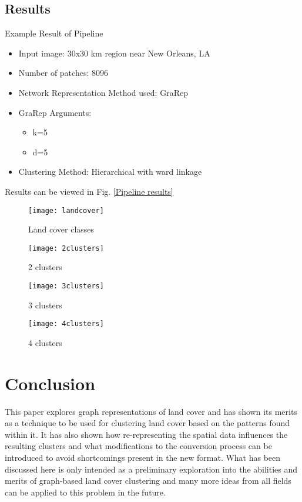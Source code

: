 \documentclass[conference]{IEEEtran}
\begin{document}
	\subsection {Results}
	Example Result of Pipeline
	\begin{itemize}
		\item Input image: 30x30 km region near New Orleans, LA
		\item Number of patches: 8096
		\item Network Representation Method used: GraRep
		\item GraRep Arguments:
		\begin{itemize}
			\item k=5
			\item d=5
		\end{itemize}
		\item Clustering Method: Hierarchical with ward linkage
		
	\end{itemize}
	Results can be viewed in Fig. \ref{Pipeline results}
	\begin{figure*}[t!]
		\centering
		\begin{subfigure}[b]{0.4\textwidth}
			\centering
			\texttt{[image: landcover]}
			\caption{Land cover classes}
			\label{base}
		\end{subfigure}
		\hfill
		\begin{subfigure}[b]{0.4\textwidth}
			\centering
			\texttt{[image: 2clusters]}
			\caption{2 clusters}
			\label{2 clusters}
		\end{subfigure}
		\hfill
		\begin{subfigure}[b]{0.4\textwidth}
			\centering
			\texttt{[image: 3clusters]}
			\caption{3 clusters}
			\label{3 clusters}
		\end{subfigure}
		\hfill
		\begin{subfigure}[b]{0.4\textwidth}
			\centering
			\texttt{[image: 4clusters]}
			\caption{4 clusters}
			\label{4 clusters}
		\end{subfigure}
		\caption{Pipeline results}
		\label{Pipeline results}
	\end{figure*}
	
	
	
	\section{Conclusion}
	This paper explores graph representations of land cover and has shown its merits as a technique to be used for clustering land cover based on the patterns found within it. It has also shown how re-representing the spatial data influences the resulting clusters and what modifications to the conversion process can be introduced to avoid shortcomings present in the new format. What has been discussed here is only intended as a preliminary exploration into the abilities and merits of graph-based land cover clustering and many more ideas from all fields can be applied to this problem in the future.
	
	
	
	
	
	
	
\end{document}

